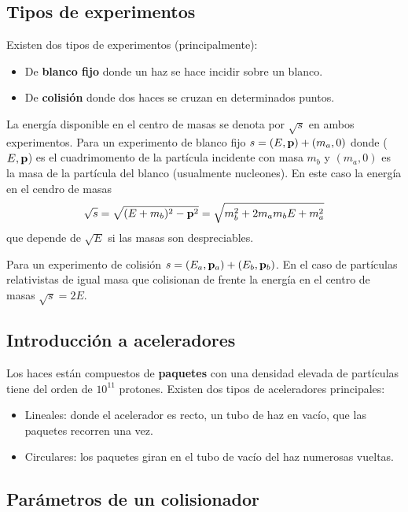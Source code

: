 \subsection{Tipos de experimentos}

Existen dos tipos de experimentos (principalmente):

\begin{itemize}
	\item De \textbf{blanco fijo} donde un haz se hace incidir sobre un blanco.
	\item De \textbf{colisión} donde dos haces se cruzan en determinados puntos. 
\end{itemize}
La energía disponible en el centro de masas se denota por $\sqrt{s}$ en ambos experimentos. Para un experimento de blanco fijo $s=(E,\mathbf{p})+(m_a,0)$ donde ($E,\mathbf{p}$) es el cuadrimomento de la partícula incidente con masa $m_b$ y $(m_a,0)$ es la masa de la partícula del blanco (usualmente nucleones). En este caso la energía en el cendro de masas 
\begin{equation}
	\sqrt{s} = \sqrt{(E+m_b)^2 - \mathbf{p}^2 } = \sqrt{m_b^2 + 2 m_a m_bE + m_a^2}
\end{equation}
que depende de $\sqrt{E}$ si las masas son despreciables. 

Para un experimento de colisión $s=(E_a,\mathbf{p}_a)+(E_b,\mathbf{p}_b)$. En el caso de partículas relativistas de igual masa que colisionan de frente la energía en el centro de masas $\sqrt{s}= 2 E$.


\subsection{Introducción a aceleradores}

Los haces están compuestos de \textbf{paquetes} con una densidad elevada de partículas tiene del orden de $10^{11}$ protones. Existen dos tipos de aceleradores principales:

\begin{itemize}
	\item Lineales: donde el acelerador es recto, un tubo de haz en vacío, que las paquetes recorren una vez.
	\item Circulares: los paquetes giran en el tubo de vacío del haz numerosas vueltas.
\end{itemize}

\subsection{Parámetros de un colisionador}

